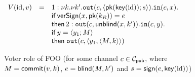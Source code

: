 \begin{figure}[t]
  \centering $
  \begin{array}[h]{rclr}
    V(\id,v) &=&\phase{1}
                 \new k.\new k'.\Out(c, \langle \pk(\key(\id)); s\rangle). 
              \In(c, x). \\   %
             && \If\, \versign(x,\pk(k_R))=e &\\
             && \Then\, \phase{2} \Out(c,\unbl(x,k')). 
             \In(c, y). \\   %
             && \If\, y=\langle y_1 ; M\rangle \\
             && \Then\;\Out(c,\pair{y_1}{\pair{M}{k}}) &\\
  \end{array}
  $
  \caption{Voter role of FOO (for some channel $c\in\mathcal{C}_{\mathsf{pub}}$, where
 $M = \mathsf{commit}(v,k)$, 
$ e = \mathsf{blind}(M,k')$ and
$s=\mathsf{sign}(e,\mathsf{key}(\mathrm{id}))$)}
  \label{fig:app:foo-role}
\end{figure}


